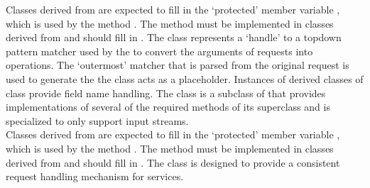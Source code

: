 Classes derived from  are expected to fill in the
`protected' member variable , which
is used by the method .
The method  must be implemented in classes derived from
 and should fill in
.
The  class represents a `handle' to a top\longDash{}down
pattern matcher used by the  to convert the arguments
of  requests into 
operations.
The `outermost' matcher that is parsed from the original request is used to generate the
 \longDash{} the  class acts as a
placeholder.
Instances of derived classes of  class provide
field name handling.
The  class is a subclass of
 that provides implementations of several of
the required methods of its superclass and is specialized to only support input streams.\\

Classes derived from  are expected to fill in the
`protected' member variable , which is used by the
method .
The method  must be implemented in classes derived from
 and should fill in
.
The  class is designed to provide a consistent
request handling mechanism for \mplusm{} services.\\

